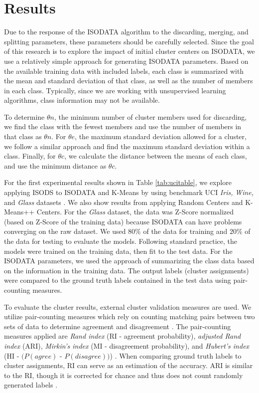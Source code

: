 \documentclass[a4paper, 10pt]{article}
\begin{document}

\section{Results}

Due to the response of the ISODATA algorithm to the discarding, merging, and
splitting parameters, these parameters should be carefully selected. Since the
goal of this research is to explore the impact of initial cluster centers on
ISODATA, we use a relatively simple approach for generating ISODATA parameters.
Based on the available training data with included labels, each class is
summarized with the mean and standard deviation of that class, as well as the
number of members in each class. Typically, since we are working with
unsupervised learning algorithms, class information may not be available.

To determine $\theta n$, the minimum number of cluster members used for
discarding, we find the class with the fewest members and use the number of
members in that class as $\theta n$. For $\theta e$, the maximum standard
deviation allowed for a cluster, we follow a similar approach and find the
maximum standard deviation within a class. Finally, for $\theta c$, we calculate
the distance between the means of each class, and use the minimum distance as
$\theta c$. 

For the first experimental results shown in Table \ref{tab:ucitable}, we explore
applying ISODS to ISODATA and K-Means by using benchmark UCI \textit{Iris,}
\textit{Wine,} and \textit{Glass} datasets \cite{Dua2019}. We also show results
from applying Random Centers and K-Means++ Centers. For the \textit{Glass}
dataset, the data was Z-Score normalized (based on Z-Score of the training data)
because ISODATA can have problems converging on the raw dataset. We used $80\%$
of the data for training and $20\%$ of the data for testing to evaluate the
models. Following standard practice, the models were trained on the training
data, then fit to the test data. For the ISODATA parameters, we used the
approach of summarizing the class data based on the information in the training
data. The output labels (cluster assignments) were compared to the ground truth
labels contained in the test data using pair-counting measures. 

To evaluate the cluster results, external cluster validation measures are used.
We utilize pair-counting measures which rely on counting matching pairs between
two sets of data to determine agreement and disagreement \cite{Rezaei2016}. The
pair-counting measures applied are \textit{Rand index} (RI - agreement
probability), \textit{adjusted Rand index} (ARI), \textit{Mirkin's index} (MI -
disagreement probability), and \textit{Hubert's index} (HI - $(P(agree)$ -
$P(disagree))$) \cite{Hubert1985, Meila2003}. When comparing ground truth labels
to cluster assignments, RI can serve as an estimation of the accuracy. ARI is
similar to the RI, though it is corrected for chance and thus does not count
randomly generated labels \cite{Rand1971}.
\end{document}
